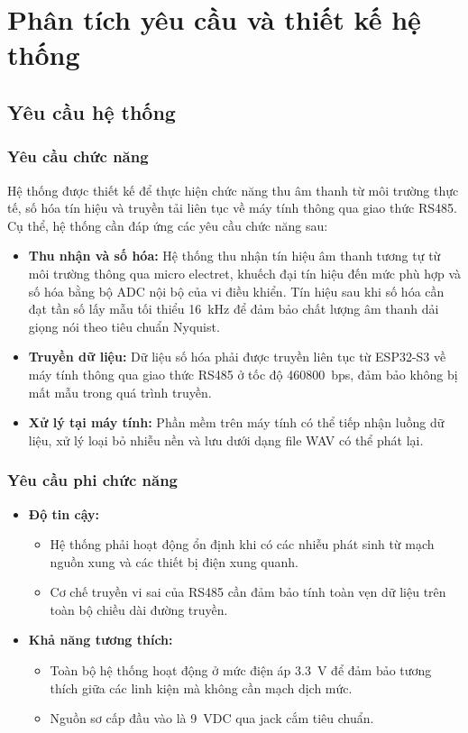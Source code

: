 \documentclass[a4paper]{report}
\begin{document}
\chapter{Phân tích yêu cầu và thiết kế hệ thống}

\section{Yêu cầu hệ thống}

\subsection{Yêu cầu chức năng}
Hệ thống được thiết kế để thực hiện chức năng thu âm thanh từ môi trường thực tế, số hóa tín hiệu và truyền tải liên tục về máy tính thông qua giao thức RS485. Cụ thể, hệ thống cần đáp ứng các yêu cầu chức năng sau:
\begin{itemize}
    \item \textbf{Thu nhận và số hóa:} Hệ thống thu nhận tín hiệu âm thanh tương tự từ môi trường thông qua micro electret, khuếch đại tín hiệu đến mức phù hợp và số hóa bằng bộ ADC nội bộ của vi điều khiển. Tín hiệu sau khi số hóa cần đạt tần số lấy mẫu tối thiểu \qty{16}{kHz} để đảm bảo chất lượng âm thanh dải giọng nói theo tiêu chuẩn Nyquist.
    \item \textbf{Truyền dữ liệu:} Dữ liệu số hóa phải được truyền liên tục từ ESP32-S3 về máy tính thông qua giao thức RS485 ở tốc độ \qty{460800}{bps}, đảm bảo không bị mất mẫu trong quá trình truyền.
    \item \textbf{Xử lý tại máy tính:} Phần mềm trên máy tính có thể tiếp nhận luồng dữ liệu, xử lý loại bỏ nhiễu nền và lưu dưới dạng file WAV có thể phát lại.
\end{itemize}

\subsection{Yêu cầu phi chức năng}
\begin{itemize}
    \item \textbf{Độ tin cậy:} 
    \begin{itemize}
        \item Hệ thống phải hoạt động ổn định khi có các nhiễu phát sinh từ mạch nguồn xung và các thiết bị điện xung quanh.
        \item Cơ chế truyền vi sai của RS485 cần đảm bảo tính toàn vẹn dữ liệu trên toàn bộ chiều dài đường truyền.
    \end{itemize}
    \item \textbf{Khả năng tương thích:} 
    \begin{itemize}
        \item Toàn bộ hệ thống hoạt động ở mức điện áp \qty{3,3}{V} để đảm bảo tương thích giữa các linh kiện mà không cần mạch dịch mức.
        \item Nguồn sơ cấp đầu vào là \qty{9}{VDC} qua jack cắm tiêu chuẩn.
    \end{itemize}
\end{itemize}
\end{document}
